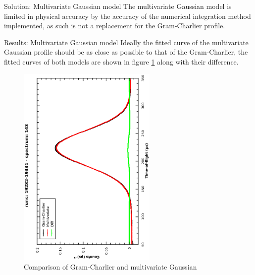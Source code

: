 \documentclass[xcolor={dvipsnames}]{beamer}
\begin{document}
\begin{frame}{}
\begin{columns}[t]
\begin{column}{.49\linewidth}
\begin{block}{\LARGE Solution: Multivariate Gaussian model}
        The multivariate Gaussian model is limited in physical accuracy by the
        accuracy of the numerical integration method implemented, as such is not
        a replacement for the Gram-Charlier profile.
      \end{block}

      \begin{block}{\LARGE Results: Multivariate Gaussian model}
        Ideally the fitted curve of the multivariate Gaussian profile should be
        as close as possible to that of the Gram-Charlier, the fitted curves of
        both models are shown in figure
        \ref{fig:multivariate_gramcharlier_comparison} along with their
        difference.

        \begin{figure}[h!]
          \centering
          \begin{turn}{-90}
            \includegraphics[width=0.6\textwidth]{graphics/multivariate_gramcharlier_comparison.eps}
          \end{turn}
          \caption{Comparison of Gram-Charlier and multivariate Gaussian}
          \label{fig:multivariate_gramcharlier_comparison}
        \end{figure}
      \end{block}
    \end{column}


\end{columns}
\end{frame}
\end{document}
